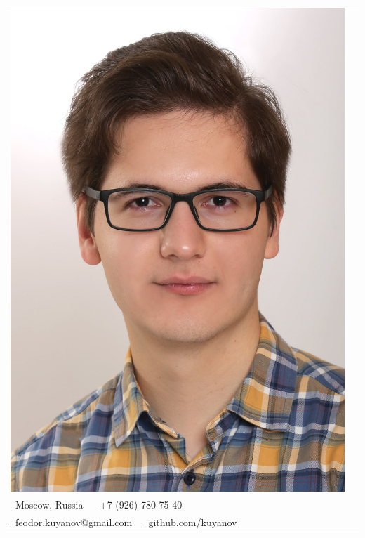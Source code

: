 \documentclass[letterpaper,11pt]{article}
\begin{document}
\begin{tabular}{l c}
	\begin{minipage}{0.2\textwidth}
		\includegraphics[width=\textwidth]{25.11.23-2.jpg}
	\end{minipage} &
	\begin{minipage}{0.65\textwidth}
	\begin{center}
		\vspace{15pt}
		{\Huge \scshape Fedor Kuyanov} \\ 
		\vspace{15pt}
		\small \raisebox{-0.1\height}\faHome\ Moscow, Russia ~ 
		\small \raisebox{-0.1\height}\faPhone\ +7 (926) 780-75-40 ~ \\
		\vspace{5pt}
		\href{mailto:feodor.kuyanov@gmail.com}{\raisebox{-0.2\height}\faEnvelope\  \underline{feodor.kuyanov@gmail.com}} ~ 
		\href{https://github.com/kuyanov}{\raisebox{-0.2\height}\faGithub\ \underline{github.com/kuyanov}}
	\end{center}
	\end{minipage}
\end{tabular}
\end{document}
